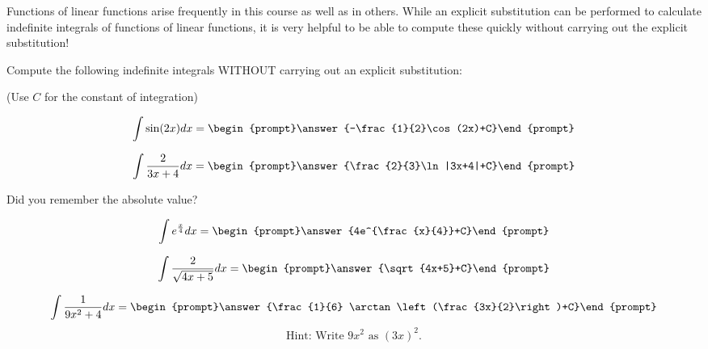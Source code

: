 \documentclass{ximera}
\author{Jim Talamo}
\begin{document}
\begin{exercise}

Functions of linear functions arise frequently in this course as well as in others.  While an explicit substitution can be performed to calculate indefinite integrals of functions of linear functions, it is very helpful to be able to compute these quickly without carrying out the explicit substitution!  

Compute the following indefinite integrals WITHOUT carrying out an explicit substitution:

\begin{prompt} (Use $C$ for the constant of integration) \end{prompt}

\[\int \sin(2x) dx = \begin{prompt}\answer{-\frac{1}{2}\cos(2x)+C}\end{prompt}\]

\[\int \frac{2}{3x+4} dx = \begin{prompt}\answer{\frac{2}{3}\ln|3x+4|+C}\end{prompt}\]

\begin{hint}
Did you remember the absolute value?
\end{hint}

\[\int e^{\frac{x}{4}} dx = \begin{prompt}\answer{4e^{\frac{x}{4}}+C}\end{prompt}\]

\[\int \frac{2}{\sqrt{4x+5}} dx = \begin{prompt}\answer{\sqrt{4x+5}+C}\end{prompt}\]

\[\int \frac{1}{9x^2+4} dx = \begin{prompt}\answer{\frac{1}{6} \arctan\left(\frac{3x}{2}\right)+C}\end{prompt}\]
\[\mbox{Hint: Write $9x^2$ as $(3x)^2$.}\]





\end{exercise}
\end{document}
